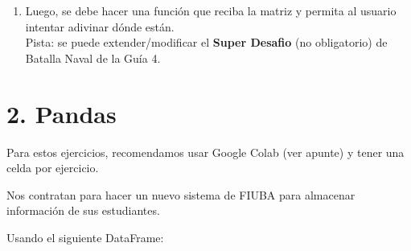 \documentclass[
  letterpaper,
  DIV=11,
  numbers=noendperiod]{scrreprt}
\providecommand{\tightlist}{%
  \setlength{\itemsep}{0pt}\setlength{\parskip}{0pt}}\usepackage{longtable,booktabs,array}
\begin{document}
\begin{enumerate}
  \begin{enumerate}
  \def\labelenumii{\alph{enumii}.}
  \setcounter{enumii}{1}
  \tightlist
  \item
    Luego, se debe hacer una función que reciba la matriz y permita al
    usuario intentar adivinar dónde están.\\
    Pista: se puede extender/modificar el \textbf{Super Desafio} (no
    obligatorio) de Batalla Naval de la Guía 4.
  \end{enumerate}
\end{enumerate}

\section*{2. Pandas}\label{pandas-1}


\begin{tcolorbox}[enhanced jigsaw, opacitybacktitle=0.6, toptitle=1mm, toprule=.15mm, arc=.35mm, breakable, bottomrule=.15mm, opacityback=0, leftrule=.75mm, rightrule=.15mm, title=\textcolor{quarto-callout-note-color}{\faInfo}\hspace{0.5em}{Note}, left=2mm, bottomtitle=1mm, colframe=quarto-callout-note-color-frame, colback=white, titlerule=0mm, coltitle=black, colbacktitle=quarto-callout-note-color!10!white]

Para estos ejercicios, recomendamos usar Google Colab (ver apunte) y
tener una celda por ejercicio.

\end{tcolorbox}

Nos contratan para hacer un nuevo sistema de FIUBA para almacenar
información de sus estudiantes.

Usando el siguiente DataFrame:
\end{document}

